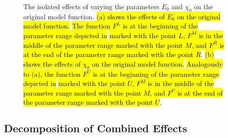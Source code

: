 \begin{figure}
	\centering
	\caption[The effects of single parameters on the original model function]{
		The isolated effects of varying the parameters $E_0$ and $\chi_0$ on the original model function.
		\hl{
			(a) shows the effects of $E_0$ on the original model function.
		}
		\hl{The function $F^L$ is at the beginning of the parameter range depicted in}  \hl{marked with the point $L$, $F^M$ is in the middle of the parameter range marked with the point $M$, and $F^R$ is at the end of the parameter range marked with the point $R$}.
		\hl{
			(b) shows the effects of $\chi_0$ on the original model function.
		}
		\hl{Analogously to (a), the function $F^U$ is at the beginning of the parameter range depicted in}  \hl{marked with the point $U$, $F^M$ is in the middle of the parameter range marked with the point $M$, and $F^U$ is at the end of the parameter range marked with the point $U$}.
	}
	\label{fig:setup.char.evolution.single}
\end{figure}

\subsection{Decomposition of Combined Effects}
\label{sec:yunus.param.effects.decomposition}


